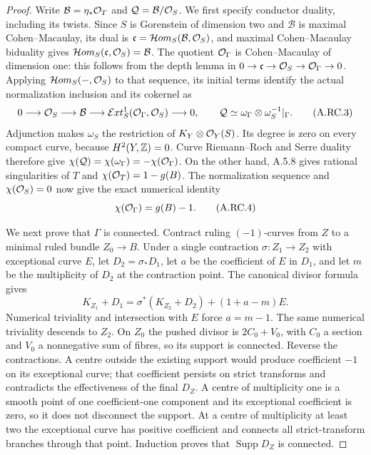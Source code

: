 \begin{proof}
Write $\mathcal B=\eta_*\mathcal O_T$ and
$\mathcal Q=\mathcal B/\mathcal O_S$. We first specify conductor
duality, including its twists. Since $S$ is Gorenstein of
dimension two and $\mathcal B$ is maximal Cohen--Macaulay,
its dual is $\mathfrak c=\mathcal Hom_S(\mathcal B,\mathcal O_S)$,
and maximal Cohen--Macaulay biduality gives
$\mathcal Hom_S(\mathfrak c,\mathcal O_S)=\mathcal B$.
The quotient $\mathcal O_\Gamma$ is Cohen--Macaulay of dimension one:
this follows from the depth lemma in
$0\to\mathfrak c\to\mathcal O_S\to\mathcal O_\Gamma\to0$.
Applying $\mathcal Hom_S(-,\mathcal O_S)$ to that sequence, its
initial terms identify the actual normalization inclusion and
its cokernel as
\[
 0\longrightarrow\mathcal O_S\longrightarrow\mathcal B
 \longrightarrow
 \mathcal Ext^1_S(\mathcal O_\Gamma,\mathcal O_S)\longrightarrow0,
 \qquad
 \mathcal Q\simeq\omega_\Gamma\otimes\omega_S^{-1}|_\Gamma.
                                                               \tag{A.RC.3}
\]
Adjunction makes $\omega_S$ the restriction of
$K_Y\otimes\mathcal O_Y(S)$. Its degree is zero on every compact
curve, because $H^2(Y,\mathbb Z)=0$. Curve Riemann--Roch and Serre
duality therefore give
$\chi(\mathcal Q)=\chi(\omega_\Gamma)=-\chi(\mathcal O_\Gamma)$.
On the other hand, A.5.8 gives rational singularities of $T$
and $\chi(\mathcal O_T)=1-g(B)$. The normalization sequence and
$\chi(\mathcal O_S)=0$ now give the exact numerical identity
\[
                   \chi(\mathcal O_\Gamma)=g(B)-1.          \tag{A.RC.4}
\]

We next prove that $\Gamma$ is connected. Contract ruling
$(-1)$-curves from $Z$ to a minimal ruled bundle $Z_0\to B$.
Under a single contraction $\sigma:Z_1\to Z_2$ with exceptional
curve $E$, let $D_2=\sigma_*D_1$, let $a$ be the coefficient
of $E$ in $D_1$, and let $m$ be the multiplicity of $D_2$ at
the contraction point. The canonical divisor formula gives
\[
 K_{Z_1}+D_1=\sigma^*(K_{Z_2}+D_2)+(1+a-m)E.
                                                               \tag{A.RC.5}
\]
Numerical triviality and intersection with $E$ force $a=m-1$.
The same numerical triviality descends to $Z_2$. On $Z_0$
the pushed divisor is $2C_0+V_0$, with $C_0$ a section and
$V_0$ a nonnegative sum of fibres, so its support is connected.
Reverse the contractions. A centre outside the existing support
would produce coefficient $-1$ on its exceptional curve; that
coefficient persists on strict transforms and contradicts the
effectiveness of the final $D_Z$. A centre of multiplicity one
is a smooth point of one coefficient-one component and its
exceptional coefficient is zero, so it does not disconnect the
support. At a centre of multiplicity at least two the exceptional
curve has positive coefficient and connects all strict-transform
branches through that point. Induction proves that
$\operatorname{Supp}D_Z$ is connected.


\end{proof}
